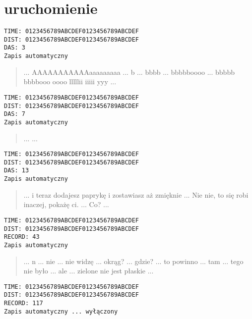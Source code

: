 \section{uruchomienie}
\label{sec:intro-boot}
%
\begin{verbatim}
TIME: 0123456789ABCDEF0123456789ABCDEF
DIST: 0123456789ABCDEF0123456789ABCDEF
DAS: 3
Zapis automatyczny 
\end{verbatim}
%
\begin{quote}
... AAAAAAAAAAAaaaaaaaaa ... b ... bbbb ... bbbbboooo ... bbbbb bbbbooo oooo lllllii iiiii yyy ...
\end{quote}
%
\begin{verbatim}
TIME: 0123456789ABCDEF0123456789ABCDEF
DIST: 0123456789ABCDEF0123456789ABCDEF
DAS: 7
Zapis automatyczny 
\end{verbatim}
%
\begin{quote}
...  ...
\end{quote}
%
\begin{verbatim}
TIME: 0123456789ABCDEF0123456789ABCDEF
DIST: 0123456789ABCDEF0123456789ABCDEF
DAS: 13
Zapis automatyczny 
\end{verbatim}
%
\begin{quote}
... i teraz dodajesz paprykę i zostawiasz aż zmięknie ... Nie nie, to się robi inaczej, pokażę ci. ... Co? ...
\end{quote}
%
\begin{verbatim}
TIME: 0123456789ABCDEF0123456789ABCDEF
DIST: 0123456789ABCDEF0123456789ABCDEF
RECORD: 43
Zapis automatyczny 
\end{verbatim}
%
\begin{quote}
... n ... nie ... nie widzę ... okrąg? ... gdzie? ... to powinno ... tam ... tego nie było ... ale ... zielone nie jest płaskie ...
\end{quote}
%
\begin{verbatim}
TIME: 0123456789ABCDEF0123456789ABCDEF
DIST: 0123456789ABCDEF0123456789ABCDEF
RECORD: 117
Zapis automatyczny ... wyłączony
\end{verbatim}
\pagebreak

